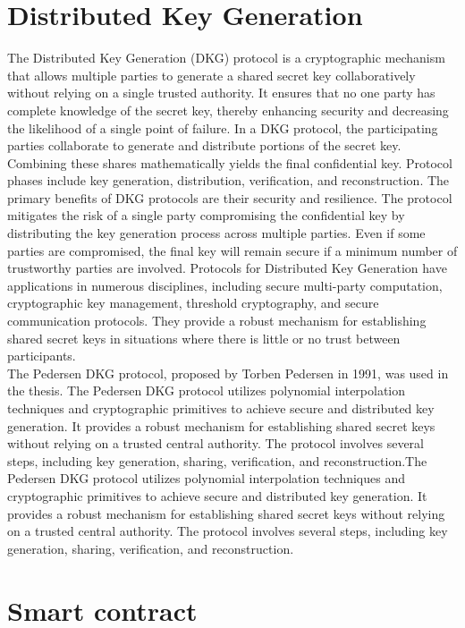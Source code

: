 \documentclass[../Main.tex]{subfiles}
\begin{document}
\section{Distributed Key Generation}
The Distributed Key Generation (DKG) protocol is a cryptographic mechanism that allows multiple parties to generate a shared secret key collaboratively without relying on a single trusted authority. It ensures that no one party has complete knowledge of the secret key, thereby enhancing security and decreasing the likelihood of a single point of failure. In a DKG protocol, the participating parties collaborate to generate and distribute portions of the secret key. Combining these shares mathematically yields the final confidential key. Protocol phases include key generation, distribution, verification, and reconstruction. The primary benefits of DKG protocols are their security and resilience. The protocol mitigates the risk of a single party compromising the confidential key by distributing the key generation process across multiple parties. Even if some parties are compromised, the final key will remain secure if a minimum number of trustworthy parties are involved. Protocols for Distributed Key Generation have applications in numerous disciplines, including secure multi-party computation, cryptographic key management, threshold cryptography, and secure communication protocols. They provide a robust mechanism for establishing shared secret keys in situations where there is little or no trust between participants.\\
The Pedersen DKG protocol, proposed by Torben Pedersen \cite{pedersen1991threshold} in 1991, was used in the thesis. The Pedersen DKG protocol utilizes polynomial interpolation techniques and cryptographic primitives to achieve secure and distributed key generation. It provides a robust mechanism for establishing shared secret keys without relying on a trusted central authority. The protocol involves several steps, including key generation, sharing, verification, and reconstruction.The Pedersen DKG protocol utilizes polynomial interpolation techniques and cryptographic primitives to achieve secure and distributed key generation. It provides a robust mechanism for establishing shared secret keys without relying on a trusted central authority. The protocol involves several steps, including key generation, sharing, verification, and reconstruction.

\section{Smart contract}

\end{document}
